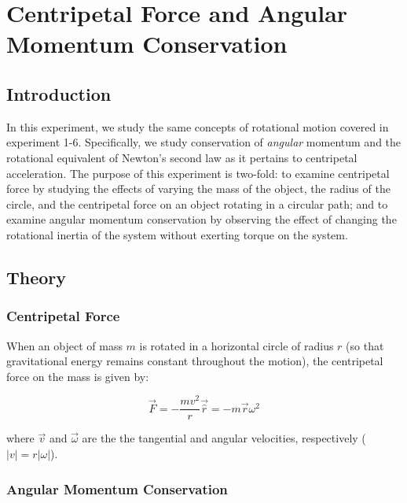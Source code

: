 \chapter{Centripetal Force and Angular Momentum Conservation}
\label{chap:centripetal}
\section{Introduction}
In this experiment, we study the same concepts of rotational motion covered in experiment 1-6. Specifically, we study conservation of {\it{angular}} momentum and the rotational equivalent of Newton's second law as it pertains to centripetal acceleration. The purpose of this experiment is two-fold: to examine centripetal force by studying the effects of varying the mass of the object, the radius of the circle, and the centripetal force on an object rotating in a circular path; and to examine angular momentum conservation by observing the effect of changing the rotational inertia of the system without exerting torque on the system.

\section{Theory}
\subsection{Centripetal Force}
When an object of mass $m$ is rotated in a horizontal circle of radius $r$ (so that gravitational energy remains constant throughout the motion), the centripetal force on the mass is given by:

\begin{equation}
\vec F = - \frac{m v^{2}}{r} \vec {\hat r} =- m \vec r \omega ^2
\end{equation} 

\noindent where $\vec v$ and $\vec \omega$ are the the tangential and angular velocities, respectively ($|v| = r |\omega|$).

\subsection{Angular Momentum Conservation}

